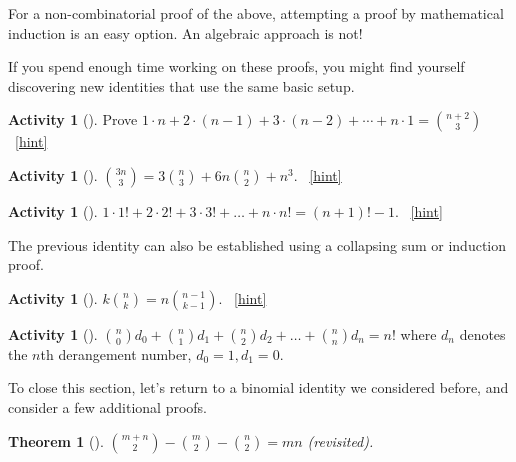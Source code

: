 \documentclass[10pt,]{book}
\theoremstyle{plain}
\newtheorem{theorem}{Theorem}[section]
\theoremstyle{definition}
\theoremstyle{definition}
\theoremstyle{definition}
\newtheorem{activity}[project]{Activity}
\numberwithin{equation}{chapter}
\begin{document}
\hypertarget{p-272}{}%
For a non-combinatorial proof of the above, attempting a proof by mathematical induction is an easy option. An algebraic approach is not!%
\par
\hypertarget{p-273}{}%
If you spend enough time working on these proofs, you might find yourself discovering new identities that use the same basic setup.%
\begin{activity}[]\label{activity-41}
\hypertarget{p-274}{}%
Prove \(1\cdot n + 2 \cdot (n-1) + 3 \cdot (n-2) + \cdots + n \cdot 1 = \binom{n+2}{3}\)%
~\hfill{\tiny\hyperlink{a-41}{[hint]}\hypertarget{q-41}{}}\end{activity}
\begin{activity}[]\label{activity-42}
\hypertarget{p-278}{}%
\(\binom{3n}{3} = 3 \binom{n}{3} + 6n \binom{n}{2} + n^{3}\).%
~\hfill{\tiny\hyperlink{a-42}{[hint]}\hypertarget{q-42}{}}\end{activity}
\begin{activity}[]\label{activity-43}
\hypertarget{p-281}{}%
\(1 \cdot 1! + 2 \cdot 2! + 3 \cdot 3! + \ldots + n \cdot n! = \left( n + 1 \right)! - 1\).%
~\hfill{\tiny\hyperlink{a-43}{[hint]}\hypertarget{q-43}{}}\end{activity}
\hypertarget{p-284}{}%
The previous identity can also be established using a collapsing sum or induction proof.%
\begin{activity}[]\label{activity-44}
\hypertarget{p-285}{}%
\(k \binom{n}{k} = n \binom{n - 1}{k - 1}\).%
~\hfill{\tiny\hyperlink{a-44}{[hint]}\hypertarget{q-44}{}}\end{activity}
\begin{activity}[]\label{activity-45}
\hypertarget{p-289}{}%
\(\binom{n}{0} d_{0} + \binom{n}{1} d_{1} + \binom{n}{2} d_{2} + \ldots + \binom{n}{n} d_{n} = n!\) where \(d_{n}\) denotes the \(n\)th derangement number, \(d_{0} = 1,d_{1} = 0\).%
\end{activity}
\hypertarget{p-291}{}%
To close this section, let's return to a binomial identity we considered before, and consider a few additional proofs.%
\begin{theorem}[{}]\label{theorem-3}
\hypertarget{p-292}{}%
\(\binom{m + n}{2} - \binom{m}{2} - \binom{n}{2} = mn\) (revisited).%
\end{theorem}
\end{document}
